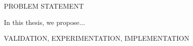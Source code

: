 \renewcommand{\sfdefault}{phv}
PROBLEM STATEMENT

In this thesis, we propose...

VALIDATION, EXPERIMENTATION, IMPLEMENTATION